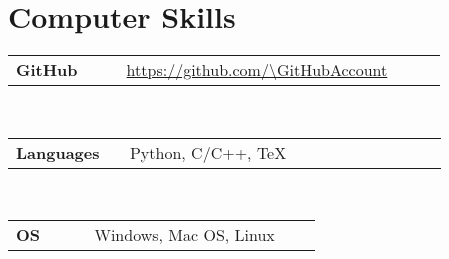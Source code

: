 \newcommand{\skill}[2]
  {\small \color{maincolor}
    \begin{tabular}{@{} p{0.22\linewidth} p{0.64\linewidth}}
      \textbf{\color{hlcolor-0} #1} & \textcolor{maincolor}{#2}
    \end{tabular}}
  
\newcommand{\github}
  {\small \url{https://github.com/\GitHubAccount}}


\section*{Computer Skills}
\begin{cvcontent}
  \skill{GitHub}{\github}\\ [0.5mm]
  \skill{Languages}{Python, C/C++, TeX}\\ [0.5mm]
  \skill{OS}{Windows, Mac OS, Linux}
\end{cvcontent}
